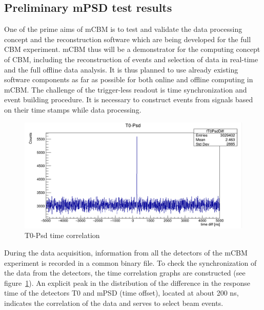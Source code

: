 \documentclass[a4paper,11pt]{article}
\begin{document}
\subsection{Preliminary mPSD test results}
One of the prime aims of mCBM is to test and validate the data processing concept and the reconstruction software which are being developed for the full CBM experiment. mCBM thus will be a demonstrator for the computing concept of CBM, including the reconstruction of events and selection of data in real-time and the full offline data analysis. It is thus planned to use already existing software components as far as possible for both online and offline computing in mCBM.
The challenge of the trigger-less readout is time synchronization and event building procedure. It is necessary to construct events from signals based on their time stamps while data processing.

\begin{figure}[htbp]
\centering %
\includegraphics[width=\textwidth]{run582T0Psd.png}

\caption{\label{fig:6} T0-Psd time correlation}
\end{figure}

During the data acquisition, information from all the detectors of the mCBM experiment is recorded in a common binary file. To check the synchronization of the data from the detectors, the time correlation graphs are constructed (see figure~\ref{fig:6}). An explicit peak in the distribution of the difference in the response time of the detectors T0 and mPSD (time offset), located at about 200 ns, indicates the correlation of the data and serves to select beam events.
\end{document}
